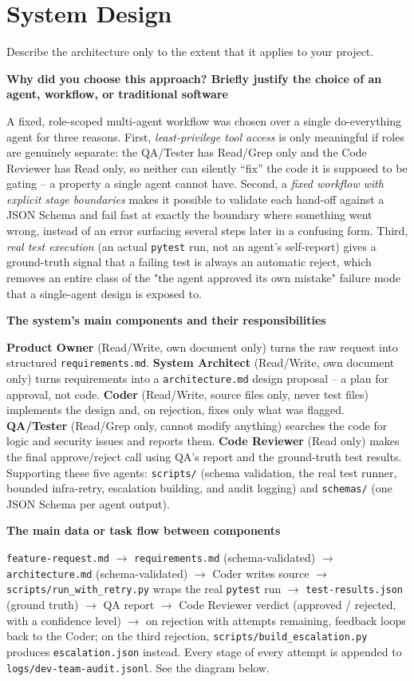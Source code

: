 \documentclass[11pt,a4paper]{article}
\newcommand{\sectionintro}[1]{\textcolor{courseGray}{\small #1}\par\vspace{2pt}}
\newcommand{\answerarea}[2]{\textbf{#1}\par\begin{answerbox}#2\end{answerbox}}
\begin{document}
\section{System Design}
\sectionintro{Describe the architecture only to the extent that it applies to your project.}

\answerarea{Why did you choose this approach? Briefly justify the choice of an agent, workflow, or traditional software}{
A fixed, role-scoped multi-agent workflow was chosen over a single do-everything agent for
three reasons. First, \emph{least-privilege tool access} is only meaningful if roles are
genuinely separate: the QA/Tester has Read/Grep only and the Code Reviewer has Read only,
so neither can silently ``fix'' the code it is supposed to be gating -- a property a single
agent cannot have. Second, a \emph{fixed workflow with explicit stage boundaries} makes it
possible to validate each hand-off against a JSON Schema and fail fast at exactly the
boundary where something went wrong, instead of an error surfacing several steps later in a
confusing form. Third, \emph{real test execution} (an actual \texttt{pytest} run, not an
agent's self-report) gives a ground-truth signal that a failing test is always an automatic
reject, which removes an entire class of the "the agent approved its own mistake" failure
mode that a single-agent design is exposed to.
}

\answerarea{The system's main components and their responsibilities}{
\textbf{Product Owner} (Read/Write, own document only) turns the raw request into structured
\texttt{requirements.md}. \textbf{System Architect} (Read/Write, own document only) turns
requirements into a \texttt{architecture.md} design proposal -- a plan for approval, not
code. \textbf{Coder} (Read/Write, source files only, never test files) implements the
design and, on rejection, fixes only what was flagged. \textbf{QA/Tester} (Read/Grep only,
cannot modify anything) searches the code for logic and security issues and reports them.
\textbf{Code Reviewer} (Read only) makes the final approve/reject call using QA's report and
the ground-truth test results. Supporting these five agents: \texttt{scripts/} (schema
validation, the real test runner, bounded infra-retry, escalation building, and audit
logging) and \texttt{schemas/} (one JSON Schema per agent output).
}

\answerarea{The main data or task flow between components}{
\texttt{feature-request.md} $\rightarrow$ \texttt{requirements.md} (schema-validated)
$\rightarrow$ \texttt{architecture.md} (schema-validated) $\rightarrow$ Coder writes source
$\rightarrow$ \texttt{scripts/run\_with\_retry.py} wraps the real \texttt{pytest} run
$\rightarrow$ \texttt{test-results.json} (ground truth) $\rightarrow$ QA report
$\rightarrow$ Code Reviewer verdict (approved / rejected, with a confidence level)
$\rightarrow$ on rejection with attempts remaining, feedback loops back to the Coder; on the
third rejection, \texttt{scripts/build\_escalation.py} produces \texttt{escalation.json}
instead. Every stage of every attempt is appended to
\texttt{logs/dev-team-audit.jsonl}. See the diagram below.
}
\end{document}

